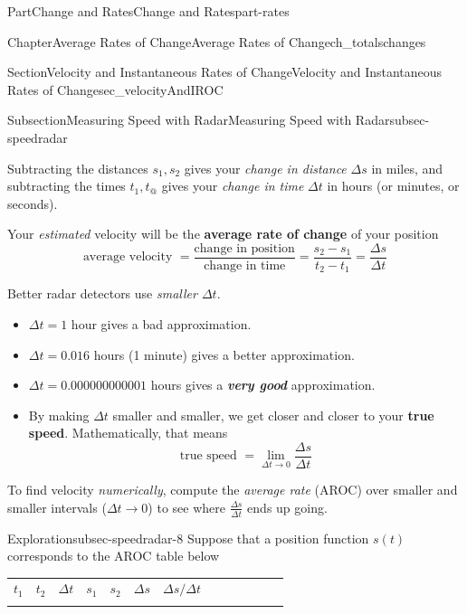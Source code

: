 \documentclass{tufte-book}
\newcommand{\tabularfont}{\relax}
\newcommand{\alert}[1]{\textbf{\textit{#1}}}
\newcommand{\terminology}[1]{\textbf{#1}}
\numberwithin{equation}{chapter}
\newcommand{\hrulemedium}{\noalign{\hrule height 0.07em}}
\begin{document}
\begin{partptx}{Part}{Change and Rates}{}{Change and Rates}{}{}{part-rates}
\begin{chapterptx}{Chapter}{Average Rates of Change}{}{Average Rates of Change}{}{}{ch_totalschanges}
\begin{sectionptx}{Section}{Velocity and Instantaneous Rates of Change}{}{Velocity and Instantaneous Rates of Change}{}{}{sec_velocityAndIROC}
\begin{subsectionptx}{Subsection}{Measuring Speed with Radar}{}{Measuring Speed with Radar}{}{}{subsec-speedradar}
\begin{image}{0}{1}{0}{}
{
}%
\end{image}%
Subtracting the distances \(s_1,s_2\) gives your \emph{change in distance} \(\Delta s\) in miles, and subtracting the times \(t_1,t_@\) gives your \emph{change in time} \(\Delta t\) in hours (or minutes, or seconds).%
\par
Your \emph{estimated} velocity will be the \terminology{average rate of change} of your position%
\begin{equation*}
\text{average velocity } = \dfrac{\text{change in position}}{\text{change in time}} = \dfrac{s_2-s_1}{t_2-t_1} = \dfrac{\Delta s}{\Delta t}
\end{equation*}
%
\par
Better radar detectors use \emph{smaller \(\Delta t\)}.%
\begin{itemize}[label=\textbullet]
\item{}\(\Delta t = 1\) hour gives a bad approximation.%
\item{}\(\Delta t = 0.016\) hours (1 minute) gives a better approximation.%
\item{}\(\Delta t = 0.000000000001\) hours gives a \alert{very good} approximation.%
\item{}By making \(\Delta t\) smaller and smaller, we get closer and closer to your \terminology{true speed}.  Mathematically, that means%
\begin{equation*}
\text{true speed } = \lim_{\Delta t\rightarrow 0} \dfrac{\Delta s}{\Delta t} 
\end{equation*}
%
\end{itemize}
%
\par
To find velocity \emph{numerically}, compute the \emph{average rate} (AROC) over smaller and smaller intervals (\(\Delta t\rightarrow 0\)) to see where \(\frac{\Delta s}{\Delta t}\) ends up going.%
\begin{exploration}{Exploration}{}{subsec-speedradar-8}%
Suppose that a position function \(s(t)\) corresponds to the AROC table below \begin{center}%
{\tabularfont%
\begin{tabular}{lBlBlBlBlBlBl}
\(t_1\)&\(t_2\)&\(\Delta t\)&\(s_1\)&\(s_2\)&\(\Delta s\)&\(\Delta s/\Delta t\)\tabularnewline\hrulemedium

\end{tabular}}
\end{center}
\end{exploration}
\end{subsectionptx}
\end{sectionptx}
\end{chapterptx}
\end{partptx}
\end{document}

